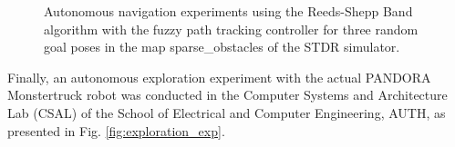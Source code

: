 \documentclass[conference]{IEEEtran}
\begin{document}
\begin{figure}[!ht]
	\centering
	\hspace{0.03\linewidth}
	\hspace{0.03\linewidth}
	\caption{Autonomous navigation experiments using the Reeds-Shepp Band algorithm with the fuzzy path tracking controller for three random goal poses in the map sparse\_obstacles of the STDR simulator.}
	\label{fig:rsband_exp}
\end{figure}

Finally, an autonomous exploration experiment with the actual PANDORA Monstertruck robot was conducted in the Computer Systems and Architecture Lab (CSAL) of the School of Electrical and Computer Engineering, AUTH, as presented in Fig. \ref{fig:exploration_exp}.
\end{document}
